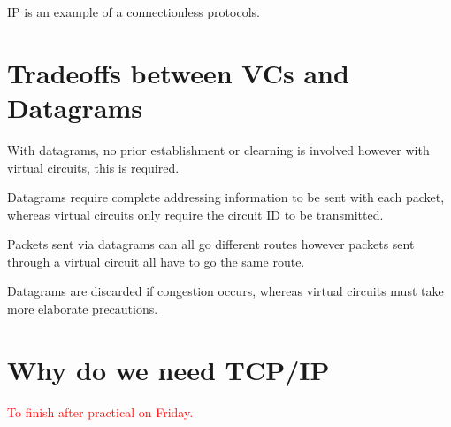 IP is an example of a connectionless protocols. 

\section*{Tradeoffs between VCs and Datagrams}
With datagrams, no prior establishment or clearning is involved however with virtual circuits, this is required.

Datagrams require complete addressing information to be sent with each packet, whereas virtual circuits only require the circuit ID to be transmitted.

Packets sent via datagrams can all go different routes however packets sent through a virtual circuit all have to go the same route.

Datagrams are discarded if congestion occurs, whereas virtual circuits must take more elaborate precautions.

\section*{Why do we need TCP/IP}

\textcolor{red}{To finish after practical on Friday.}